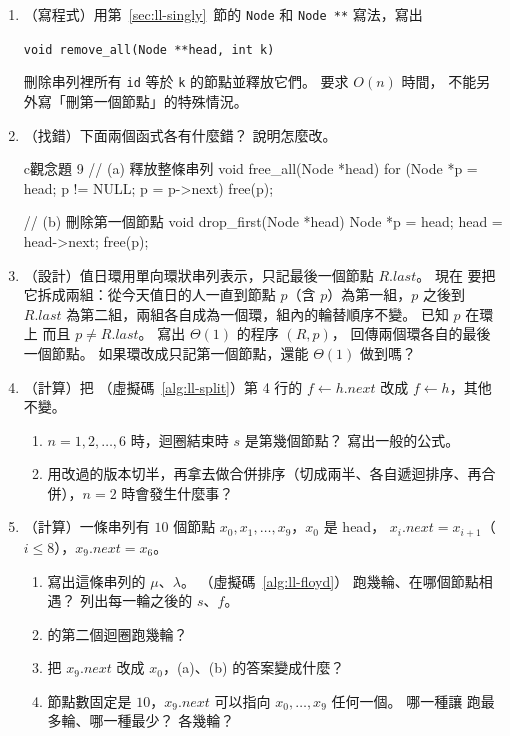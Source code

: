 \begin{enumerate}
\item （寫程式）用第~\ref{sec:ll-singly}~節的 \texttt{Node} 和 \texttt{Node **}
寫法，寫出
\begin{center}
\texttt{void remove\_all(Node **head, int k)}
\end{center}
刪除串列裡所有 \texttt{id} 等於 \texttt{k} 的節點並釋放它們。 要求 $O(n)$ 時間，
不能另外寫「刪第一個節點」的特殊情況。

\item （找錯）下面兩個函式各有什麼錯？ 說明怎麼改。
\begin{code}{c}{觀念題 9}
// (a) 釋放整條串列
void free_all(Node *head)
{
    for (Node *p = head; p != NULL; p = p->next)
        free(p);
}

// (b) 刪除第一個節點
void drop_first(Node *head)
{
    Node *p = head;
    head = head->next;
    free(p);
}
\end{code}

\item （設計）值日環用單向環狀串列表示，只記最後一個節點 $R.\mathit{last}$。 現在
要把它拆成兩組：從今天值日的人一直到節點 $p$（含 $p$）為第一組，$p$ 之後到
$R.\mathit{last}$ 為第二組，兩組各自成為一個環，組內的輪替順序不變。 已知 $p$ 在環上
而且 $p \ne R.\mathit{last}$。 寫出 $\Theta(1)$ 的程序 $(R, p)$，
回傳兩個環各自的最後一個節點。 如果環改成只記第一個節點，還能 $\Theta(1)$ 做到嗎？

\item （計算）把 （虛擬碼~\ref{alg:ll-split}）第 4 行的
$f \gets h.\mathit{next}$ 改成 $f \gets h$，其他不變。
\begin{enumerate}
\item $n = 1, 2, \ldots, 6$ 時，迴圈結束時 $s$ 是第幾個節點？ 寫出一般的公式。
\item 用改過的版本切半，再拿去做合併排序（切成兩半、各自遞迴排序、再合併），$n = 2$
時會發生什麼事？
\end{enumerate}

\item （計算）一條串列有 $10$ 個節點 $x_0, x_1, \ldots, x_9$，$x_0$ 是 head，
$x_i.\mathit{next} = x_{i+1}$（$i \le 8$），$x_9.\mathit{next} = x_6$。
\begin{enumerate}
\item 寫出這條串列的 $\mu$、$\lambda$。 （虛擬碼~\ref{alg:ll-floyd}）
跑幾輪、在哪個節點相遇？ 列出每一輪之後的 $s$、$f$。
\item {} 的第二個迴圈跑幾輪？
\item 把 $x_9.\mathit{next}$ 改成 $x_0$，(a)、(b) 的答案變成什麼？
\item 節點數固定是 $10$，$x_9.\mathit{next}$ 可以指向 $x_0, \ldots, x_9$ 任何一個。
哪一種讓  跑最多輪、哪一種最少？ 各幾輪？
\end{enumerate}


\end{enumerate}
